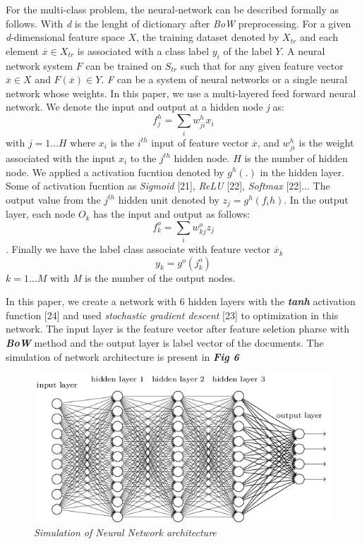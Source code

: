 \documentclass[conference]{IEEEtran}
\begin{document}
For the multi-class problem, the neural-network can be described formally as follows.	 With \textit{d} is the lenght of dictionary after \textit{BoW} preprocessing. For a given \textit{d}-dimensional feature space $X$, the training dataset denoted by $X_{tr}$ and  each element $\overline{x}\in X_{tr}$ is associated with a class label $y_i$ of the label $Y$. A neural network system $F$ can be trained on $S_{tr}$ such that for any given feature vector $\overline{x}\in X$ and 	$F(\overline{x})\in Y$. \textit{F} can be a system of neural networks or a single neural network whose weights. In this paper, we use a multi-layered feed forward neural network. We
denote the input and output at a hidden node \textit{j} as:
\[f_{j}^{h}=\sum_{i}w_{ji}^{h}x_i\]
with $j=1...H$ where $x_i$ is the $i^{th}$ input of feature vector 	$\overline{x}$, and $w_{ji}^{h}$ is the weight
associated with the input $x_i$ to the $j^{th}$ hidden node. $H$ is the number of hidden node. We applied a activation fucntion denoted by $g^h(.)$  in the hidden layer. Some of activation fucntion as \textit{Sigmoid} [21], \textit{ReLU} [22], \textit{Softmax} [22]... The output value from the $j^{th}$ hidden unit denoted by $z_j=g^h(f_{i}{h})$. In the output layer, each node $O_k$ has the input and output as follows:
\[f_{k}^{o}=\sum_{i}w_{kj}^{o}z_j\]. Finally we have the label class associate with feature vector $\overline{x}_k$
\[y_k=g^o(j_{k}^{o})\]
$k=1...M$ with \textit{M} is the number of the output nodes.

In this paper, we create a network with 6 hidden layers with the \textit{\textbf{tanh}} activation function [24] and used \textit{stochastic gradient descent} [23] to optimization in this network. The input layer is the feature vector after feature seletion pharse with \textit{\textbf{BoW}} method and the output layer is label vector of the documents. The simulation of network architecture is present in \textbf{\textit{Fig 6}}

\begin{figure}[h]
\includegraphics[scale=0.45]{dense.png}
\centering
\caption{\textit{Simulation of Neural Network architecture}}
\end{figure}
\end{document}
